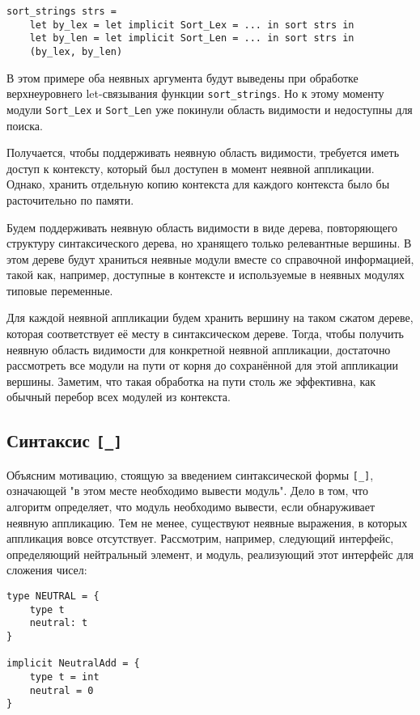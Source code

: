 \documentclass[../diploma.tex]{subfiles}
\begin{document}
\begin{verbatim}
sort_strings strs = 
    let by_lex = let implicit Sort_Lex = ... in sort strs in
    let by_len = let implicit Sort_Len = ... in sort strs in
    (by_lex, by_len)
\end{verbatim}

В этом примере оба неявных аргумента будут выведены при обработке верхнеуровнего let-связывания функции \texttt{sort_strings}. Но к этому моменту модули \texttt{Sort_Lex} и \texttt{Sort_Len} уже покинули область видимости и недоступны для поиска.

Получается, чтобы поддерживать неявную область видимости, требуется иметь доступ к контексту, который был доступен в момент неявной аппликации. Однако, хранить отдельную копию контекста для каждого контекста было бы расточительно по памяти. 

Будем поддерживать неявную область видимости в виде дерева, повторяющего структуру синтаксического дерева, но хранящего только релевантные вершины. В этом дереве будут храниться неявные модули вместе со справочной информацией, такой как, например, доступные в контексте и используемые в неявных модулях типовые переменные. 

Для каждой неявной аппликации будем хранить вершину на таком сжатом дереве, которая соответствует её месту в синтаксическом дереве. Тогда, чтобы получить неявную область видимости для конкретной неявной аппликации, достаточно рассмотреть все модули на пути от корня до сохранённой для этой аппликации вершины. Заметим, что такая обработка на пути столь же эффективна, как обычный перебор всех модулей из контекста. 

\subsection{Синтаксис \texttt{[_]}}

Объясним мотивацию, стоящую за введением синтаксической формы \texttt{[_]}, означающей "в этом месте необходимо вывести модуль". Дело в том, что алгоритм определяет, что модуль необходимо вывести, если обнаруживает неявную аппликацию. Тем не менее, существуют неявные выражения, в которых аппликация вовсе отсутствует. Рассмотрим, например, следующий интерфейс, определяющий нейтральный элемент, и модуль, реализующий этот интерфейс для сложения чисел:

\begin{verbatim}
type NEUTRAL = {
    type t
    neutral: t
}

implicit NeutralAdd = {
    type t = int
    neutral = 0
}
\end{verbatim}
\end{document}
